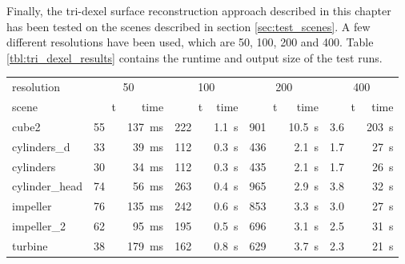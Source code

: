Finally, the tri-dexel surface reconstruction approach described in this chapter has been tested on the scenes described in section \ref{sec:test_scenes}.
A few different resolutions have been used, which are 50, 100, 200 and 400.
Table \ref{tbl:tri_dexel_results} contains the runtime and output size of the test runs.
%
\begin{table}
	\begin{subtable}{\textwidth}
		\centering
		\begin{tabular}{l|rr|rr|rr|rr}
			resolution     & \multicolumn{2}{c}{50} & \multicolumn{2}{c}{100} & \multicolumn{2}{c}{200} & \multicolumn{2}{c}{400} \\
			scene          & t\sub{out} & time & t\sub{out} & time & t\sub{out} & time & t\sub{out} & time \\
			\midrule
			cube2          & \SI{55}{\kilo\nothing} & \SI{137}{\milli\second} & \SI{222}{\kilo\nothing} & \SI{1.1}{\second} & \SI{901}{\kilo\nothing} & \SI{10.5}{\second} & \SI{3.6}{\mega\nothing} & \SI{203}{\second} \\
			cylinders\_d   & \SI{33}{\kilo\nothing} & \SI{ 39}{\milli\second} & \SI{112}{\kilo\nothing} & \SI{0.3}{\second} & \SI{436}{\kilo\nothing} & \SI{ 2.1}{\second} & \SI{1.7}{\mega\nothing} & \SI{ 27}{\second} \\
			cylinders      & \SI{30}{\kilo\nothing} & \SI{ 34}{\milli\second} & \SI{112}{\kilo\nothing} & \SI{0.3}{\second} & \SI{435}{\kilo\nothing} & \SI{ 2.1}{\second} & \SI{1.7}{\mega\nothing} & \SI{ 26}{\second} \\
			cylinder\_head & \SI{74}{\kilo\nothing} & \SI{ 56}{\milli\second} & \SI{263}{\kilo\nothing} & \SI{0.4}{\second} & \SI{965}{\kilo\nothing} & \SI{ 2.9}{\second} & \SI{3.8}{\mega\nothing} & \SI{ 32}{\second} \\
			impeller       & \SI{76}{\kilo\nothing} & \SI{135}{\milli\second} & \SI{242}{\kilo\nothing} & \SI{0.6}{\second} & \SI{853}{\kilo\nothing} & \SI{ 3.3}{\second} & \SI{3.0}{\mega\nothing} & \SI{ 27}{\second} \\
			impeller\_2    & \SI{62}{\kilo\nothing} & \SI{ 95}{\milli\second} & \SI{195}{\kilo\nothing} & \SI{0.5}{\second} & \SI{696}{\kilo\nothing} & \SI{ 3.1}{\second} & \SI{2.5}{\mega\nothing} & \SI{ 31}{\second} \\
			turbine        & \SI{38}{\kilo\nothing} & \SI{179}{\milli\second} & \SI{162}{\kilo\nothing} & \SI{0.8}{\second} & \SI{629}{\kilo\nothing} & \SI{ 3.7}{\second} & \SI{2.3}{\mega\nothing} & \SI{ 21}{\second} \\

\end{tabular}
\end{subtable}
\end{table}
